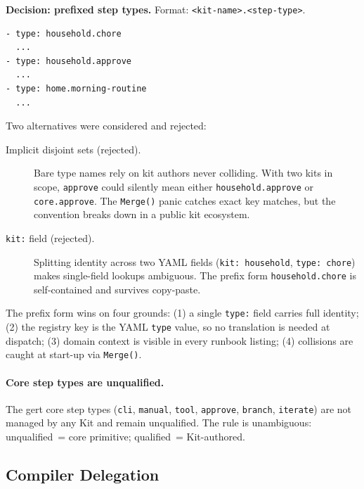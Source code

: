 \textbf{Decision: prefixed step types.}  Format: \texttt{<kit-name>.<step-type>}.

\begin{verbatim}
- type: household.chore
  ...
- type: household.approve
  ...
- type: home.morning-routine
  ...
\end{verbatim}

Two alternatives were considered and rejected:

\begin{description}
  \item[Implicit disjoint sets (rejected).]  Bare type names rely on kit authors
    never colliding.  With two kits in scope, \texttt{approve} could silently
    mean either \texttt{household.approve} or \texttt{core.approve}.  The
    \texttt{Merge()} panic catches exact key matches, but the convention breaks
    down in a public kit ecosystem.

  \item[\texttt{kit:} field (rejected).]  Splitting identity across two YAML
    fields (\texttt{kit: household}, \texttt{type: chore}) makes single-field
    lookups ambiguous.  The prefix form \texttt{household.chore} is
    self-contained and survives copy-paste.
\end{description}

The prefix form wins on four grounds: (1) a single \texttt{type:} field carries
full identity; (2) the registry key is the YAML \texttt{type} value, so no
translation is needed at dispatch; (3) domain context is visible in every
runbook listing; (4) collisions are caught at start-up via \texttt{Merge()}.

\paragraph{Core step types are unqualified.}  The gert core step types
(\texttt{cli}, \texttt{manual}, \texttt{tool}, \texttt{approve},
\texttt{branch}, \texttt{iterate}) are not managed by any Kit and remain
unqualified.  The rule is unambiguous: unqualified~= core primitive;
qualified~= Kit-authored.

\subsection{Compiler Delegation}
\label{subsec:kit-compiler-delegation}

